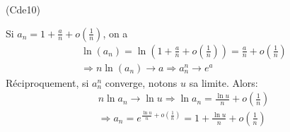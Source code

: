 \begin{tiny}(Cde10)\end{tiny} 
Si $a_n = 1+\frac{a}{n}+o(\frac{1}{n})$, on a 
\begin{multline*}
 \ln(a_n)=\ln(1+\frac{a}{n}+o(\frac{1}{n}))=\frac{a}{n}+o(\frac{1}{n})\\
\Rightarrow n\ln(a_n)\rightarrow a \Rightarrow a_n^n \rightarrow e^a
\end{multline*}
Réciproquement, si $a_n^n$ converge, notons $u$ sa limite. Alors:
\begin{multline*}
 n\ln a_n \rightarrow \ln u \Rightarrow \ln a_n = \frac{\ln u}{n} +o(\frac{1}{n}) \\
\Rightarrow a_n = e^{\frac{\ln u}{n} +o(\frac{1}{n})} = 1 + \frac{\ln u}{n} +o(\frac{1}{n})
\end{multline*}
